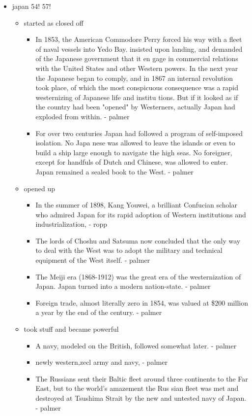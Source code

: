 \documentclass[letterpaper]{article}
\begin{document}
\begin{itemize}
\item japan 54! 57!

\begin{itemize}
\item started as closed off

\begin{itemize}
\item In 1853, the American Commodore Perry forced his way with a fleet
of naval vessels into Yedo Bay. insisted upon landing, and
demanded of the Japanese government that it en gage in commercial
relations with the United States and other Western powers. In the
next year the Japanese began to comply, and in 1867 an internal
revolution took place, of which the most conspicuous consequence
was a rapid westernizing of Japanese life and institu tions. But
if it looked as if the country had been "opened" by Westerners,
actually Japan had exploded from within. - palmer
\item For over two centuries Japan had followed a program of
self-imposed isolation. No Japa nese was allowed to leave the
islands or even to build a ship large enough to navigate the high
seas. No foreigner, except for handfuls of Dutch and Chinese, was
allowed to enter. Japan remained a sealed book to the West. -
palmer
\end{itemize}

\item opened up

\begin{itemize}
\item In the summer of 1898, Kang Youwei, a brilliant Confucian scholar
who admired Japan for its rapid adoption of Western institutions
and industrialization, - ropp
\item The lords of Choshu and Satsuma now concluded that the only way to
deal with the West was to adopt the military and technical
equipment of the West itself. - palmer
\item The Meiji era (1868-1912) was the great era of the westernization
of Japan. Japan turned into a modern nation-state. - palmer
\item Foreign trade, almost literally zero in 1854, was valued at \$200
million a year by the end of the century. - palmer
\end{itemize}

\item took stuff and became powerful

\begin{itemize}
\item A navy, modeled on the British, followed somewhat later. - palmer
\item newly western,zecl army and navy, - palmer
\item The Russians sent their Baltic fleet around three continents to
the Far East, but to the world's amazement the Rus sian fleet was
met and destroyed at Tsushima Strait by the new and untested navy
of Japan. - palmer
\end{itemize}
\end{itemize}


\end{itemize}
\end{document}
